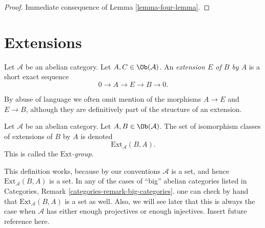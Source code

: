 \begin{proof}
Immediate consequence of
Lemma \ref{lemma-four-lemma}.
\end{proof}








\section{Extensions}
\label{section-extensions}

\begin{definition}
\label{definition-extension}
Let $\mathcal{A}$ be an abelian category.
Let $A, C \in \Ob(\mathcal{A})$.
An {\it extension $E$ of $B$ by $A$} is a short
exact sequence
$$
0 \to A \to E \to B \to 0.
$$
\end{definition}

\noindent
By abuse of language we often omit mention of the
morphisms $A \to E$ and $E \to B$, although they are
definitively part of the structure of an extension.

\begin{definition}
\label{definition-ext-group}
Let $\mathcal{A}$ be an abelian category.
Let $A, B \in \Ob(\mathcal{A})$.
The set of isomorphism classes of extensions
of $B$ by $A$ is denoted
$$
\text{Ext}_\mathcal{A}(B, A).
$$
This is called the {\it $\text{Ext}$-group}.
\end{definition}

\noindent
This definition works, because by our conventions
$\mathcal{A}$ is a set, and hence
$\text{Ext}_\mathcal{A}(B, A)$ is a set.
In any of the cases of ``big'' abelian categories
listed in Categories, Remark \ref{categories-remark-big-categories}.
one can check by hand that $\text{Ext}_\mathcal{A}(B, A)$
is a set as well. Also, we will see later that this is
always the case when $\mathcal{A}$ has either enough projectives
or enough injectives. Insert future reference here.

